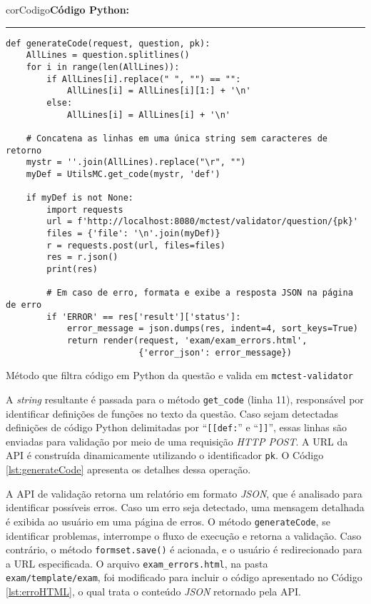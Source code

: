 \begin{listing}[!ht]
    \begin{myboxCode}{corCodigo}{\textbf{Código Python: }}\vspace{3mm}
    \hrule
    \begin{verbatim}
def generateCode(request, question, pk):
    AllLines = question.splitlines()
    for i in range(len(AllLines)):
        if AllLines[i].replace(" ", "") == "":
            AllLines[i] = AllLines[i][1:] + '\n'
        else:
            AllLines[i] = AllLines[i] + '\n'

    # Concatena as linhas em uma única string sem caracteres de retorno
    mystr = ''.join(AllLines).replace("\r", "")
    myDef = UtilsMC.get_code(mystr, 'def')

    if myDef is not None:
        import requests
        url = f'http://localhost:8080/mctest/validator/question/{pk}'
        files = {'file': '\n'.join(myDef)}
        r = requests.post(url, files=files)
        res = r.json()
        print(res)

        # Em caso de erro, formata e exibe a resposta JSON na página de erro
        if 'ERROR' == res['result']['status']:
            error_message = json.dumps(res, indent=4, sort_keys=True)
            return render(request, 'exam/exam_errors.html', 
                          {'error_json': error_message})
\end{verbatim}
\end{myboxCode}
\caption{Método que filtra código em Python da questão e valida em \texttt{mctest-validator}}
\label{lst:generateCode}
\end{listing}


A \textit{string} resultante é passada para o método \texttt{get\_code} (linha 11), responsável por identificar definições de funções no texto da questão. Caso sejam detectadas definições de código Python delimitadas por ``\texttt{[[def:}'' e ``\texttt{]]}'', essas linhas são enviadas para validação por meio de uma requisição \textit{HTTP POST}. A URL da API é construída dinamicamente utilizando o identificador \texttt{pk}. O Código \ref{lst:generateCode} apresenta os detalhes dessa operação.

A API de validação retorna um relatório em formato \textit{JSON}, que é analisado para identificar possíveis erros. Caso um erro seja detectado, uma mensagem detalhada é exibida ao usuário em uma página de erros. O método \texttt{generateCode}, se identificar problemas, interrompe o fluxo de execução e retorna a validação. Caso contrário, o método \texttt{formset.save()} é acionada, e o usuário é redirecionado para a URL especificada. O arquivo \texttt{exam\_errors.html}, na pasta \texttt{exam/template/exam}, foi modificado para incluir o código apresentado no Código \ref{lst:erroHTML}, o qual trata o conteúdo \textit{JSON} retornado pela API.

